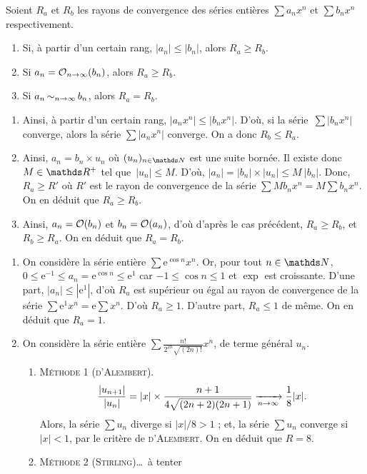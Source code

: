 \begin{prop}
	Soient $R_a$\/ et $R_b$\/ les rayons de convergence des séries entières $\sum a_n x^n$\/ et $\sum b_n x^n$\/ respectivement.
	\begin{enumerate}
		\item Si, à partir d'un certain rang, $|a_n| \le |b_n|$, alors $R_a \ge R_b$.
		\item Si $a_n = \operatorname*{\mathcal{O}}_{n\to \infty}(b_n)$, alors $R_a \ge R_b$.
		\item Si $a_n \operatorname*{\sim}_{n\to \infty} b_n$, alors $R_a = R_b$.
	\end{enumerate}
\end{prop}

\begin{prv}
	\begin{enumerate}
		\item Ainsi, à partir d'un certain rang, $|a_n x^n| \le |b_n x^n|$.
			D'où, si la série~$\sum |b_n x^n|$\/ converge, alors la série $\sum |a_n x^n|$\/ converge.
			On a donc $R_b \le R_a$.
		\item Ainsi, $a_n = b_n \times u_n$\/ où $(u_n)_{n\in\N}$\/ est une suite bornée. Il existe donc $M \in \R^+$\/ tel que~$|u_n| \le M$.
			D'où, $|a_n| = |b_n| \times |u_n| \le M\:|b_n|$.
			Donc, $R_a \ge R'$ où $R'$\/ est le rayon de convergence de la série $\sum M b_n x^n = M \sum b_n x^n$. On en déduit que $R_a \ge R_b$.
		\item Ainsi, $a_n = \operatorname*{\mathcal{O}}(b_n)$\/ et $b_n = \operatorname*{\mathcal{O}}(a_n)$, d'où d'après le cas précédent, $R_a \ge R_b$, et $R_b \ge R_a$. On en déduit que $R_a = R_b$.
	\end{enumerate}
\end{prv}

\begin{exo}
	\begin{enumerate}
		\item On considère la série entière $\sum \mathrm{e}^{\cos n} x^n$.
			Or, pour tout $n \in \N$, $0 \le \mathrm{e}^{-1} \le a_n = \mathrm{e}^{\cos n} \le \mathrm{e}^{1}$\/ car $-1 \le \cos n \le 1$\/ et $\exp$\/ est croissante.
			D'une part, $|a_n| \le |\mathrm{e}^{1}|$, d'où $R_a$\/ est supérieur ou égal au rayon de convergence de la série $\sum \mathrm{e}^{1} x^n = \mathrm{e}\sum x^n$. D'où $R_a \ge 1$.
			D'autre part, $R_a \le 1$\/ de même. On en déduit que $R_a = 1$.
		\item On considère la série entière $\sum \frac{n!}{2^{2n} \sqrt{(2n)!}} x^n$, de terme général $u_n$.
			\begin{enumerate}
				\item \textsc{Méthode 1 (d'Alembert}).
					\[
						\frac{|u_{n+1}|}{|u_n|} = |x| \times \frac{n+1}{4\sqrt{(2n+2)(2n+1)}} \xrightarrow[n\to \infty]{} \frac{1}{8} |x|
					.\] Alors, la série $\sum u_n$\/ diverge si $|x| / 8 > 1$\/ ; et, la série $\sum u_n$\/ converge si $|x| < 1$, par le critère de \textsc{d'Alembert}. On en déduit que $R = 8$.
				\item \textsc{Méthode 2 (Stirling)}\ldots\ à tenter
			\end{enumerate}
	\end{enumerate}
\end{exo}
